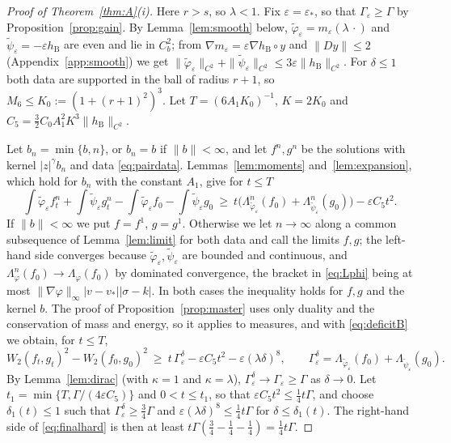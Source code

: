\documentclass[11pt]{amsart}
\theoremstyle{definition}
\newcommand{\nb}{\|b\|}
\newcommand{\hB}{h_{\mathrm B}}
\begin{document}
\begin{proof}[Proof of Theorem~\ref{thm:A}\textup{(i)}]
Here $r>s$, so $\lambda<1$. Fix $\varepsilon=\varepsilon_*$, so that $\Gamma_\varepsilon\ge\Gamma$ by Proposition~\ref{prop:gain}. By Lemma~\ref{lem:smooth} below, $\tilde\varphi_\varepsilon=m_\varepsilon(\lambda\,\cdot)$ and $\tilde\psi_\varepsilon=-\varepsilon\hB$ are even and lie in $C^2_b$; from $\nabla m_\varepsilon=\varepsilon\nabla\hB\circ y$ and $\|Dy\|\le2$ (Appendix~\ref{app:smooth}) we get $\|\tilde\varphi_\varepsilon\|_{C^2}+\|\tilde\psi_\varepsilon\|_{C^2}\le3\varepsilon\|\hB\|_{C^2}$. For $\delta\le1$ both data are supported in the ball of radius $r+1$, so $M_6\le K_0:=(1+(r+1)^2)^3$. Let $T=(6A_1K_0)^{-1}$, $K=2K_0$ and $C_5=\frac32C_0A_1^2K^3\|\hB\|_{C^2}$.

Let $b_n=\min\{b,n\}$, or $b_n=b$ if $\nb<\infty$, and let $f^n,g^n$ be the solutions with kernel $|z|^\gamma b_n$ and data \eqref{eq:pairdata}. Lemmas~\ref{lem:moments} and~\ref{lem:expansion}, which hold for $b_n$ with the constant $A_1$, give for $t\le T$
\[
\int\tilde\varphi_\varepsilon f^n_t+\int\tilde\psi_\varepsilon g^n_t-\int\tilde\varphi_\varepsilon f_0-\int\tilde\psi_\varepsilon g_0\ \ge\ t\big(\Lambda^n_{\tilde\varphi_\varepsilon}(f_0)+\Lambda^n_{\tilde\psi_\varepsilon}(g_0)\big)-\varepsilon C_5t^2 .
\]
If $\nb<\infty$ we put $f=f^1$, $g=g^1$. Otherwise we let $n\to\infty$ along a common subsequence of Lemma~\ref{lem:limit} for both data and call the limits $f,g$; the left-hand side converges because $\tilde\varphi_\varepsilon,\tilde\psi_\varepsilon$ are bounded and continuous, and $\Lambda^n_\varphi(f_0)\to\Lambda_\varphi(f_0)$ by dominated convergence, the bracket in \eqref{eq:Lphi} being at most $\|\nabla\varphi\|_\infty|v-v_*||\sigma-k|$. In both cases the inequality holds for $f,g$ and the kernel $b$. The proof of Proposition~\ref{prop:master} uses only duality and the conservation of mass and energy, so it applies to measures, and with \eqref{eq:deficitB} we obtain, for $t\le T$,
\begin{equation}\label{eq:finalhard}
W_2(f_t,g_t)^2-W_2(f_0,g_0)^2\ \ge\ t\,\Gamma^\delta_\varepsilon-\varepsilon C_5t^2-\varepsilon(\lambda\delta)^8,\qquad \Gamma^\delta_\varepsilon=\Lambda_{\tilde\varphi_\varepsilon}(f_0)+\Lambda_{\tilde\psi_\varepsilon}(g_0).
\end{equation}
By Lemma~\ref{lem:dirac} (with $\kappa=1$ and $\kappa=\lambda$), $\Gamma^\delta_\varepsilon\to\Gamma_\varepsilon\ge\Gamma$ as $\delta\to0$. Let $t_1=\min\{T,\Gamma/(4\varepsilon C_5)\}$ and $0<t\le t_1$, so that $\varepsilon C_5t^2\le\frac14t\Gamma$, and choose $\delta_1(t)\le1$ such that $\Gamma^\delta_\varepsilon\ge\frac34\Gamma$ and $\varepsilon(\lambda\delta)^8\le\frac14t\Gamma$ for $\delta\le\delta_1(t)$. The right-hand side of \eqref{eq:finalhard} is then at least $t\Gamma(\frac34-\frac14-\frac14)=\frac14t\Gamma$.
\end{proof}
\end{document}
